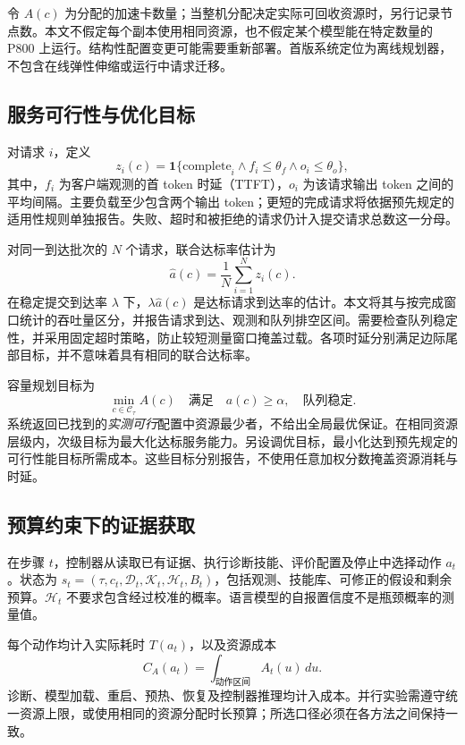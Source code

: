\documentclass[preprint,12pt]{elsarticle}
\begin{document}
令 $A(c)$ 为分配的加速卡数量；当整机分配决定实际可回收资源时，另行记录节点数。本文不假定每个副本使用相同资源，也不假定某个模型能在特定数量的 P800 上运行。结构性配置变更可能需要重新部署。首版系统定位为离线规划器，不包含在线弹性伸缩或运行中请求迁移。

\subsection{服务可行性与优化目标}
对请求 $i$，定义
\begin{equation}
 z_i(c)=\mathbf{1}\{\text{complete}_i \land f_i\leq\theta_f
                  \land o_i\leq\theta_o\},
\end{equation}
其中，$f_i$ 为客户端观测的首 token 时延（TTFT），$o_i$ 为该请求输出 token 之间的平均间隔。主要负载至少包含两个输出 token；更短的完成请求将依据预先规定的适用性规则单独报告。失败、超时和被拒绝的请求仍计入提交请求总数这一分母。

对同一到达批次的 $N$ 个请求，联合达标率估计为
\begin{equation}
 \widehat a(c)=\frac{1}{N}\sum_{i=1}^{N}z_i(c).
\end{equation}
在稳定提交到达率 $\lambda$ 下，$\lambda\widehat a(c)$ 是达标请求到达率的估计。本文将其与按完成窗口统计的吞吐量区分，并报告请求到达、观测和队列排空区间。需要检查队列稳定性，并采用固定超时策略，防止较短测量窗口掩盖过载。各项时延分别满足边际尾部目标，并不意味着具有相同的联合达标率。

容量规划目标为
\begin{equation}
 \min_{c\in\mathcal{C}_{\tau}} A(c)
 \quad\text{满足}\quad
 a(c)\geq\alpha,\quad\text{队列稳定}.
 \label{eq:capacity}
\end{equation}
系统返回已找到的\emph{实测可行}配置中资源最少者，不给出全局最优保证。在相同资源层级内，次级目标为最大化达标服务能力。另设调优目标，最小化达到预先规定的可行性能目标所需成本。这些目标分别报告，不使用任意加权分数掩盖资源消耗与时延。

\subsection{预算约束下的证据获取}
在步骤 $t$，控制器从读取已有证据、执行诊断技能、评价配置及停止中选择动作 $a_t$。状态为 $s_t=(\tau,c_t,\mathcal{D}_t,\mathcal{K}_t,\mathcal{H}_t,B_t)$，包括观测、技能库、可修正的假设和剩余预算。$\mathcal{H}_t$ 不要求包含经过校准的概率。语言模型的自报置信度不是瓶颈概率的测量值。

每个动作均计入实际耗时 $T(a_t)$，以及资源成本
\begin{equation}
 C_A(a_t)=\int_{\text{动作区间}} A_t(u)\,du.
\end{equation}
诊断、模型加载、重启、预热、恢复及控制器推理均计入成本。并行实验需遵守统一资源上限，或使用相同的资源分配时长预算；所选口径必须在各方法之间保持一致。
\end{document}
